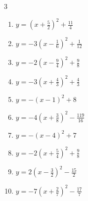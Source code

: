 \begin{multicols}{3}
\begin{enumerate}

  \item $\displaystyle y=\left( x+\frac{5}{2}\right)^{2}+\frac{11}{4}$


  \item $\displaystyle y=-3\left( x-\frac{1}{6}\right)^{2}+\frac{1}{12}$


  \item $\displaystyle y=-2\left( x-\frac{9}{4}\right)^{2}+\frac{9}{8}$


\columnbreak %

  \item $\displaystyle y=-3\left( x+\frac{4}{3}\right)^{2}+\frac{4}{3}$


  \item $\displaystyle y=-\left( x-1\right)^{2}+8$

        \phantom{$\displaystyle 頂点\left( 1 , 8 \right)$}

  \item $\displaystyle y=-4\left( x+\frac{3}{8}\right)^{2}-\frac{119}{16}$


  \item $\displaystyle y=-\left( x-4\right)^{2}+7$

        \phantom{$\displaystyle 頂点\left( 4 , 7 \right)$}

  \item $\displaystyle y=-2\left( x+\frac{5}{4}\right)^{2}+\frac{9}{8}$


  \item $\displaystyle y=2\left( x-\frac{3}{2}\right)^{2}-\frac{15}{2}$


  \item $\displaystyle y=-7\left( x+\frac{2}{7}\right)^{2}-\frac{17}{7}$


\end{enumerate}
\end{multicols}
